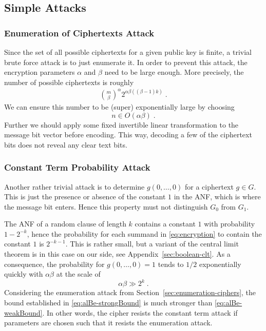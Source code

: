 \documentclass[final,journal,compsoc]{IEEEtran}
\begin{document}
\subsection{Simple Attacks\label{sec:simple-attacks}}

\subsubsection{Enumeration of Ciphertexts
  Attack\label{sec:enumeration-ciphers}}

Since the set of all possible ciphertexts for a given public key is finite, a trivial
brute force attack is to just enumerate it. 
In order to prevent this attack, the encryption parameters $\alpha$ and
$\beta$ need to be large enough. More precisely, the number of
possible ciphertexts is roughly
\begin{align}
\binom{m}{\beta}^\alpha2^{\alpha \beta ((\beta-1)k)}\;.
\end{align}
We
can ensure this number to be (super) exponentially large by
choosing
\begin{equation}
\label{eq:alBe-strongBound}
 n \in O(\alpha \beta)\;.
\end{equation}
Further we should apply some fixed invertible linear transformation to
the message bit vector before encoding. This way, decoding a few of
the ciphertext bits does not reveal any clear text bits.  




\subsubsection{Constant Term Probability
  Attack\label{sec:const-term-prob}}

Another rather trivial attack is to determine $g(0,\ldots, 0)$ for a
ciphertext $g\in G$. This is just the presence or absence of the constant
$1$ in the ANF, which is where the message bit enters. Hence this
property must not distinguish $G_0$ from $G_1$.


The ANF of a random clause of length $k$ contains a constant $1$ with
probability $1-2^{-k}$, hence the probability for each summand in
\eqref{eq:encryption} to contain the constant $1$ is
$2^{-k-1}$. This is rather small, but 
a variant of the central limit theorem is in this case on our
side,
see Appendix~\ref{sec:boolean-clt}.
As a consequence, the probability for $g(0,\ldots, 0)=1$ tends to $1/2$
exponentially quickly with $\alpha\beta$ at the scale of
\begin{equation}
\label{eq:alBe-weakBound}
\alpha\beta \gg  2^{k}
\;.
\end{equation}
Considering the enumeration attack from
Section~\ref{sec:enumeration-ciphers}, the bound 
established in \eqref{eq:alBe-strongBound} is much stronger
than \eqref{eq:alBe-weakBound}. In other words, the
cipher resists the constant term
attack if parameters are chosen such that it resists the 
enumeration attack. 
\end{document}
